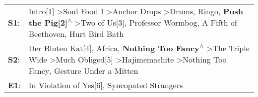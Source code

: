 \begin{supertabular}{p{0.03\textwidth}p{0.92\textwidth}}
 \textbf{S1}:  &  Intro[1]\textsuperscript{} \textgreater \enspace Soul Food I\textsuperscript{} \textgreater \enspace Anchor Drops\textsuperscript{} \textgreater \enspace Drums\textsuperscript{}, \enspace Ringo\textsuperscript{}, \enspace \textbf{Push the Pig[2]\textsuperscript{$\wedge$}} \textgreater \enspace Two of Us[3]\textsuperscript{}, \enspace Professor Wormbog\textsuperscript{}, \enspace A Fifth of Beethoven\textsuperscript{}, \enspace Hurt Bird Bath\textsuperscript{}  \enspace  \\
 \textbf{S2}:  &                                                         Der Bluten Kat[4]\textsuperscript{}, \enspace Africa\textsuperscript{}, \enspace \textbf{Nothing Too Fancy\textsuperscript{$\wedge$}} \textgreater \enspace The Triple Wide\textsuperscript{} \textgreater \enspace Much Obliged[5]\textsuperscript{} \textgreater \enspace Hajimemashite\textsuperscript{} \textgreater \enspace Nothing Too Fancy\textsuperscript{}, \enspace Gesture Under a Mitten\textsuperscript{}  \enspace  \\
 \textbf{E1}:  &                                                                                                                                                                                                                                                                                                                                                                                        In Violation of Yes[6]\textsuperscript{}, \enspace Syncopated Strangers\textsuperscript{}  \enspace  \\
\end{supertabular}
